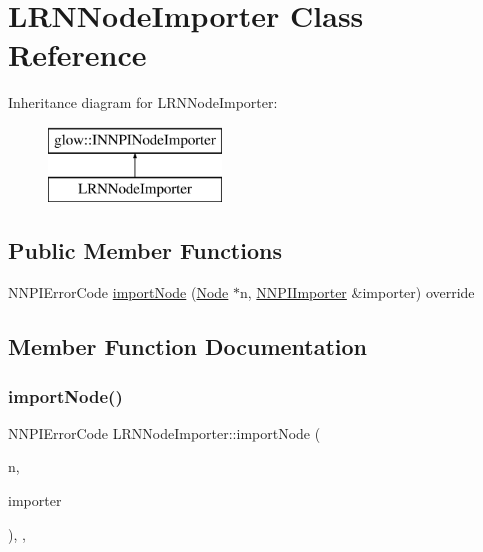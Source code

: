\hypertarget{class_l_r_n_node_importer}{}\section{L\+R\+N\+Node\+Importer Class Reference}
\label{class_l_r_n_node_importer}
Inheritance diagram for L\+R\+N\+Node\+Importer\+:\begin{figure}[H]
\begin{center}
\leavevmode
\includegraphics[height=2.000000cm]{class_l_r_n_node_importer}
\end{center}
\end{figure}
\subsection*{Public Member Functions}
\begin{DoxyCompactItemize}
\item 
N\+N\+P\+I\+Error\+Code \hyperlink{class_l_r_n_node_importer_aa3069ed5b0ebf53a1c72efdd42c0433a}{import\+Node} (\hyperlink{classglow_1_1_node}{Node} $\ast$n, \hyperlink{classglow_1_1_n_n_p_i_importer}{N\+N\+P\+I\+Importer} \&importer) override
\end{DoxyCompactItemize}


\subsection{Member Function Documentation}
\mbox{\label{class_l_r_n_node_importer_aa3069ed5b0ebf53a1c72efdd42c0433a}} 
\subsubsection{\texorpdfstring{import\+Node()}{importNode()}}
{\footnotesize\ttfamily N\+N\+P\+I\+Error\+Code L\+R\+N\+Node\+Importer\+::import\+Node (\begin{DoxyParamCaption}\item[{\hyperlink{classglow_1_1_node}{Node} $\ast$}]{n,  }\item[{\hyperlink{classglow_1_1_n_n_p_i_importer}{N\+N\+P\+I\+Importer} \&}]{importer }\end{DoxyParamCaption})\hspace{0.3cm}{\ttfamily [inline]}, {\ttfamily [override]}, {\ttfamily [virtual]}}

